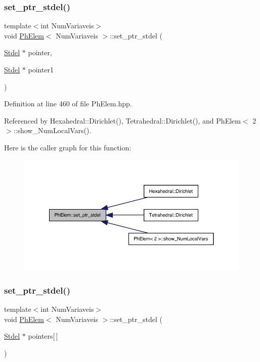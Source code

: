 \subsubsection{\texorpdfstring{set\+\_\+ptr\+\_\+stdel()}{set\_ptr\_stdel()}\hspace{0.1cm}{\footnotesize\ttfamily [1/3]}}
{\footnotesize\ttfamily template$<$int Num\+Variaveis$>$ \\
void \hyperlink{classPhElem}{Ph\+Elem}$<$ Num\+Variaveis $>$\+::set\+\_\+ptr\+\_\+stdel (\begin{DoxyParamCaption}\item[{\hyperlink{classStdel}{Stdel} $\ast$}]{pointer,  }\item[{\hyperlink{classStdel}{Stdel} $\ast$}]{pointer1 }\end{DoxyParamCaption})}



Definition at line 460 of file Ph\+Elem.\+hpp.



Referenced by Hexahedral\+::\+Dirichlet(), Tetrahedral\+::\+Dirichlet(), and Ph\+Elem$<$ 2 $>$\+::show\+\_\+\+Num\+Local\+Vars().

Here is the caller graph for this function\+:
\nopagebreak
\begin{figure}[H]
\begin{center}
\leavevmode
\includegraphics[width=341pt]{classPhElem_af2796c868709214bb9b151b47d7d471f_icgraph}
\end{center}
\end{figure}
\mbox{\label{classPhElem_aaf841c14455a54e0f33e2c74bef979fd}} 
\subsubsection{\texorpdfstring{set\+\_\+ptr\+\_\+stdel()}{set\_ptr\_stdel()}\hspace{0.1cm}{\footnotesize\ttfamily [2/3]}}
{\footnotesize\ttfamily template$<$int Num\+Variaveis$>$ \\
void \hyperlink{classPhElem}{Ph\+Elem}$<$ Num\+Variaveis $>$\+::set\+\_\+ptr\+\_\+stdel (\begin{DoxyParamCaption}\item[{\hyperlink{classStdel}{Stdel} $\ast$}]{pointers\mbox{[}$\,$\mbox{]} }\end{DoxyParamCaption})}



